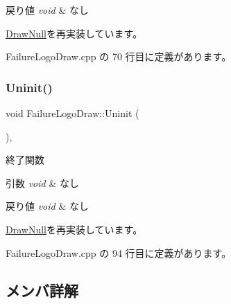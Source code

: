 \begin{DoxyRetVals}{戻り値}
{\em void} & なし \\
\hline
\end{DoxyRetVals}


\mbox{\hyperlink{class_draw_null_a20aef1e54c1a158b741bfd731e18efdf}{Draw\+Null}}を再実装しています。



 Failure\+Logo\+Draw.\+cpp の 70 行目に定義があります。

\mbox{\label{class_failure_logo_draw_a97646253380b54f37565650e211f33cd}} 
\subsubsection{\texorpdfstring{Uninit()}{Uninit()}}
{\footnotesize\ttfamily void Failure\+Logo\+Draw\+::\+Uninit (\begin{DoxyParamCaption}{ }\end{DoxyParamCaption})\hspace{0.3cm}{\ttfamily [override]}, {\ttfamily [virtual]}}



終了関数 


\begin{DoxyParams}{引数}
{\em void} & なし \\
\hline
\end{DoxyParams}

\begin{DoxyRetVals}{戻り値}
{\em void} & なし \\
\hline
\end{DoxyRetVals}


\mbox{\hyperlink{class_draw_null_a6e81d63efab7333e8d0e8af99362a4d9}{Draw\+Null}}を再実装しています。



 Failure\+Logo\+Draw.\+cpp の 94 行目に定義があります。



\subsection{メンバ詳解}
\mbox{\label{class_failure_logo_draw_a525a0b117af4655588bbd1432da50d13}} 
